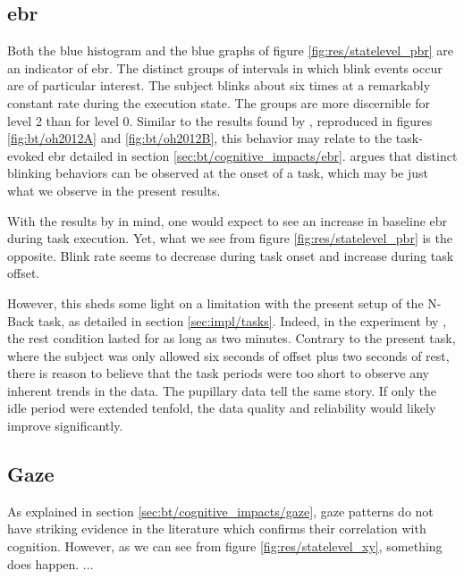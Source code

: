 % 

\subsection{\acrlong{ebr}}

Both the blue histogram and the blue graphs of figure \ref{fig:res/statelevel_pbr} are an indicator of \acrshort{ebr}. The distinct groups of intervals in which blink events occur are of particular interest. The subject blinks about six times at a remarkably constant rate during the execution state. The groups are more discernible for level 2 than for level 0. Similar to the results found by \textcite{oh2012}, reproduced in figures \ref{fig:bt/oh2012A} and \ref{fig:bt/oh2012B}, this behavior may relate to the task-evoked \acrshort{ebr} detailed in section \ref{sec:bt/cognitive_impacts/ebr}. \textcite{oh2012} argues that distinct blinking behaviors can be observed at the onset of a task, which may be just what we observe in the present results.

With the results by \textcite{oh2012} in mind, one would expect to see an increase in baseline \acrshort{ebr} during task execution. Yet, what we see from figure \ref{fig:res/statelevel_pbr} is the opposite. Blink rate seems to decrease during task onset and increase during task offset. 

However, this sheds some light on a limitation with the present setup of the N-Back task, as detailed in section \ref{sec:impl/tasks}. Indeed, in the experiment by \textcite{oh2012}, the rest condition lasted for as long as two minutes. Contrary to the present task, where the subject was only allowed six seconds of offset plus two seconds of rest, there is reason to believe that the task periods were too short to observe any inherent trends in the data. The pupillary data tell the same story. If only the idle period were extended tenfold, the data quality and reliability would likely improve significantly.


\subsection{Gaze}

As explained in section \ref{sec:bt/cognitive_impacts/gaze}, gaze patterns do not have striking evidence in the literature which confirms their correlation with cognition. However, as we can see from figure \ref{fig:res/statelevel_xy}, something does happen. ...




